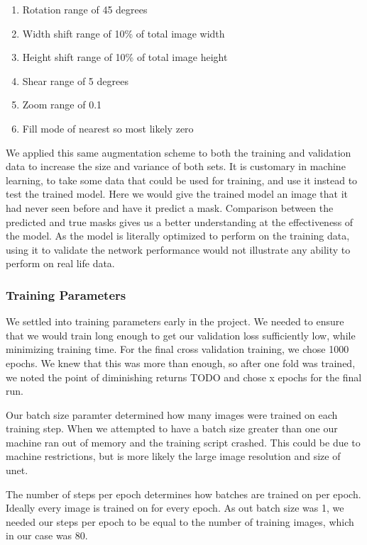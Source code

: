 \documentclass[12pt]{article}
\begin{document}
\begin{enumerate}
	\item{Rotation range of 45 degrees}
	\item{Width shift range of 10\% of total image width}
	\item{Height shift range of 10\% of total image height}
	\item{Shear range of 5 degrees}
	\item{Zoom range of 0.1 }
	\item{Fill mode of nearest so most likely zero}
\end{enumerate}

We applied this same augmentation scheme to both the training and validation data to increase the size and variance of both sets.
It is customary in machine learning, to take some data that could be used for training, and use it instead to test the trained model.
Here we would give the trained model an image that it had never seen before and have it predict a mask.
Comparison between the predicted and true masks gives us a better understanding at the effectiveness of the model.
As the model is literally optimized to perform on the training data, using it to validate the network performance would not illustrate any ability to perform on real life data.


\subsubsection{Training Parameters}
We settled into training parameters early in the project.
We needed to ensure that we would train long enough to get our validation loss sufficiently low, while minimizing training time.
For the final cross validation training, we chose 1000 epochs.
We knew that this was more than enough, so after one fold was trained, we noted the point of diminishing returns TODO and chose x epochs for the final run.

Our batch size paramter determined how many images were trained on each training step.
When we attempted to have a batch size greater than one our machine ran out of memory and the training script crashed.
This could be due to machine restrictions, but is more likely the large image resolution and size of unet.

The number of steps per epoch determines how batches are trained on per epoch.
Ideally every image is trained on for every epoch.
As out batch size was 1, we needed our steps per epoch to be equal to the number of training images, which in our case was 80.
\end{document}
